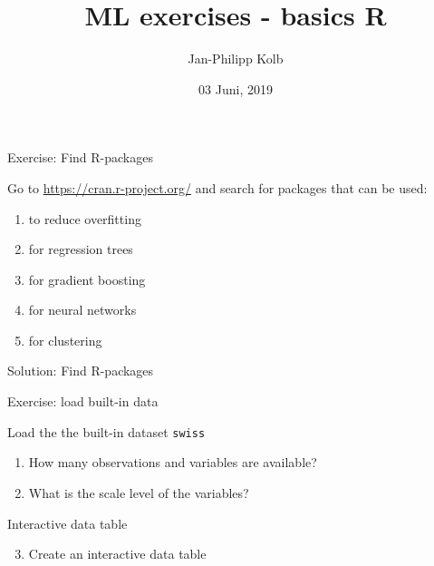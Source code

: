 \documentclass[
  10pt,
  ignorenonframetext,
]{beamer}
\title{ML exercises - basics R}
\author{Jan-Philipp Kolb}
\date{03 Juni, 2019}
\newenvironment{Shaded}{}{}
\newcommand{\CommentTok}[1]{\textcolor[rgb]{0.00,0.50,0.00}{#1}}
\newcommand{\KeywordTok}[1]{\textcolor[rgb]{0.00,0.00,1.00}{#1}}
\newcommand{\NormalTok}[1]{#1}
\newcommand{\StringTok}[1]{\textcolor[rgb]{0.00,0.50,0.50}{#1}}
\providecommand{\tightlist}{%
  \setlength{\itemsep}{0pt}\setlength{\parskip}{0pt}}
\begin{document}
\frame{\titlepage}

\begin{frame}{Exercise: Find R-packages}
\protect\hypertarget{exercise-find-r-packages}{}

Go to \url{https://cran.r-project.org/} and search for packages that can
be used:

\begin{enumerate}
[1)]
\tightlist
\item
  to reduce overfitting
\item
  for regression trees
\item
  for gradient boosting
\item
  for neural networks
\item
  for clustering
\end{enumerate}

\end{frame}

\begin{frame}[fragile]{Solution: Find R-packages}
\protect\hypertarget{solution-find-r-packages}{}

\begin{Shaded}
\end{Shaded}

\end{frame}

\begin{frame}[fragile]{Exercise: load built-in data}
\protect\hypertarget{exercise-load-built-in-data}{}

\begin{block}{Load the the built-in dataset \texttt{swiss}}

\begin{enumerate}
[1)]
\tightlist
\item
  How many observations and variables are available?
\item
  What is the scale level of the variables?
\end{enumerate}

\end{block}

\begin{block}{Interactive data table}

\begin{enumerate}
[1)]
\setcounter{enumi}{2}
\tightlist
\item
  Create an interactive data table
\end{enumerate}

\end{block}

\end{frame}
\end{document}
